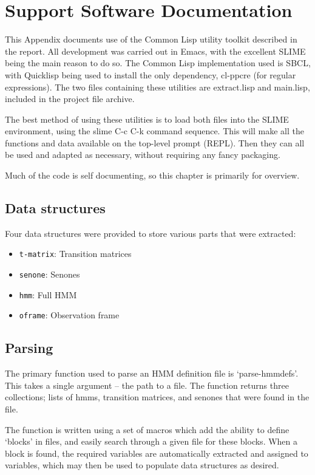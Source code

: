 \chapter{Support Software Documentation} %
\label{apdx:lisp_utils}

This Appendix documents use of the Common Lisp utility toolkit described in the report.  All development was carried out in Emacs, with the excellent SLIME being the main reason to do so.  The Common Lisp implementation used is SBCL, with Quicklisp being used to install the only dependency, cl-ppcre (for regular expressions).  The two files containing these utilities are extract.lisp and main.lisp, included in the project file archive.

The best method of using these utilities is to load both files into the SLIME environment, using the slime C-c C-k command sequence.  This will make all the functions and data available on the top-level prompt (REPL).  Then they can all be used and adapted as necessary, without requiring any fancy packaging.

Much of the code is self documenting, so this chapter is primarily for overview.

\section{Data structures} %
\label{apdx:data_structures}
	Four data structures were provided to store various parts that were extracted:
	\begin{itemize}
		\item \texttt{t-matrix}: Transition matrices
		\item \texttt{senone}: Senones
		\item \texttt{hmm}: Full HMM
		\item \texttt{oframe}: Observation frame
	\end{itemize}


\section{Parsing} %
\label{apdx:hmm_parsing}
	The primary function used to parse an HMM definition file is `parse-hmmdefs'.  This takes a single argument -- the path to a file.  The function returns three collections; lists of hmms, transition matrices, and senones that were found in the file.

	The function is written using a set of macros which add the ability to define `blocks' in files, and easily search through a given file for these blocks.  When a block is found, the required variables are automatically extracted and assigned to variables, which may then be used to populate data structures as desired.

